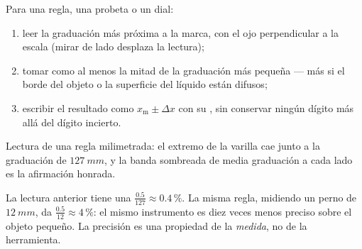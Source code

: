 \begin{method}\label{met:g10:orders-of-magnitude:reading}
Para una regla, una probeta o un dial:
\begin{enumerate}
  \item leer la graduación más próxima a la marca, con el ojo
        perpendicular a la escala (mirar de lado desplaza la lectura);
  \item tomar como  al menos la mitad de la
        graduación más pequeña --- más si el borde del objeto o la
        superficie del líquido están difusos;
  \item escribir el resultado como $x_{\text{m}} \pm \Delta x$ con su
        , sin conservar ningún dígito más allá del dígito
        incierto.
\end{enumerate}
\end{method}

\begin{omfigure}

{\small Lectura de una regla milimetrada: el extremo de la varilla cae
junto a la graduación de $\qty{127}{mm}$, y la banda sombreada de media
graduación a cada lado es la afirmación honrada.}
\end{omfigure}

\begin{example}\label{ex:g10:orders-of-magnitude:reading}
La lectura anterior tiene una 
$\frac{0.5}{127} \approx 0.4\,\%$. La misma regla, midiendo un perno de
$\qty{12}{mm}$, da $\frac{0.5}{12} \approx 4\,\%$: el mismo instrumento es
diez veces menos preciso sobre el objeto pequeño. La precisión es una
propiedad de la \emph{medida}, no de la herramienta.
\end{example}

